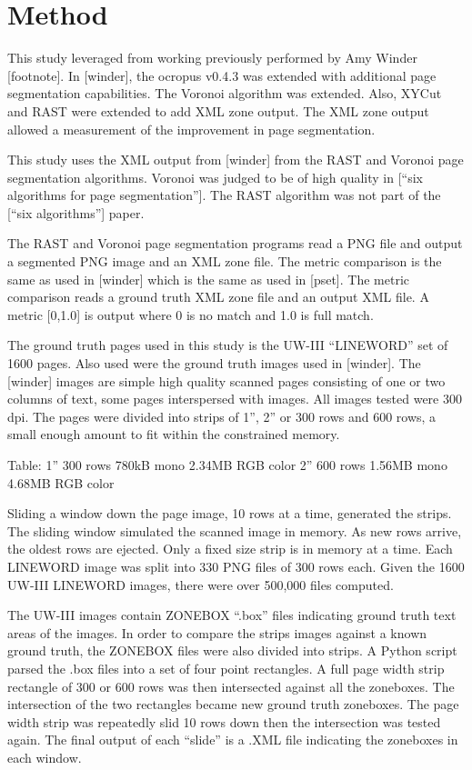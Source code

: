 \documentclass[conference]{IEEEtran}
\begin{document}
\section{Method}
This study leveraged from working previously performed by Amy Winder
[footnote]. In [winder], the ocropus v0.4.3 was extended with additional page
segmentation capabilities. The Voronoi algorithm was extended. Also, XYCut and
RAST were extended to add XML zone output. The XML zone output allowed a
measurement of the improvement in page segmentation.

This study uses the XML output from [winder] from the RAST and Voronoi page
segmentation algorithms. Voronoi was judged to be of high quality in [“six
algorithms for page segmentation”]. The RAST algorithm was not part of the
[“six algorithms”] paper. 

The RAST and Voronoi page segmentation programs read a PNG file and output a
segmented PNG image and an XML zone file. The metric comparison is the same as
used in [winder] which is the same as used in [pset]. The metric comparison
reads a ground truth XML zone file and an output XML file. A metric [0,1.0] is
output where 0 is no match and 1.0 is full match. 

The ground truth pages used in this study is the UW-III “LINEWORD” set of 1600
pages. Also used were the ground truth images used in [winder]. The [winder]
images are simple high quality scanned pages consisting of one or two columns
of text, some pages interspersed with images. All images tested were 300 dpi.
The pages were divided into strips of 1”, 2” or 300 rows and 600 rows, a small
enough amount to fit within the constrained memory. 

Table:
1” 300 rows 780kB mono  2.34MB RGB color
2” 600 rows 1.56MB mono  4.68MB RGB color

Sliding a window down the page image, 10 rows at a time, generated the strips.
The sliding window simulated the scanned image in memory. As new rows arrive,
the oldest rows are ejected. Only a fixed size strip is in memory at a
time. Each LINEWORD image was split into 330 PNG files of 300 rows each.
Given the 1600 UW-III LINEWORD images, there were over 500,000 files
computed.

The UW-III images contain ZONEBOX “.box” files indicating ground truth text
areas of the images. In order to compare the strips images against a known
ground truth, the ZONEBOX files were also divided into strips. A Python script
parsed the .box files into a set of four point rectangles. A full page width
strip rectangle of 300 or 600 rows was then intersected against all the
zoneboxes. The intersection of the two rectangles became new ground truth
zoneboxes. The page width strip was repeatedly slid 10 rows down then the
intersection was tested again. The final output of each “slide” is a .XML file
indicating the zoneboxes in each window.
\end{document}
